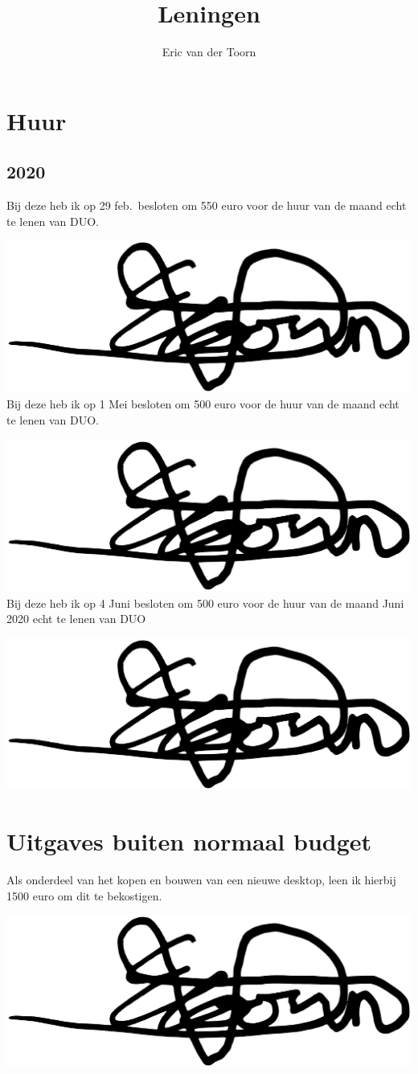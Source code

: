 \documentclass[12pt,a4paper]{article}
\title{Leningen}
\author{Eric van der Toorn}
\newcommand{\sign}{\par \includegraphics[height=2\baselineskip]{sig}}
\begin{document}
\maketitle

\section{Huur}
\subsection{2020}
Bij deze heb ik op 29 feb.\ besloten om 550 euro voor de huur van de maand echt te lenen van DUO.
\sign
\\
Bij deze heb ik op 1 Mei besloten om 500 euro voor de huur van de maand echt te lenen van DUO.
\sign
\\
Bij deze heb ik op 4 Juni besloten om 500 euro voor de huur van de maand Juni 2020 echt te lenen van DUO
\sign



\section{Uitgaves buiten normaal budget}

Als onderdeel van het kopen en bouwen van een nieuwe desktop, leen ik hierbij 1500 euro om dit te bekostigen.

\sign%
\end{document}
